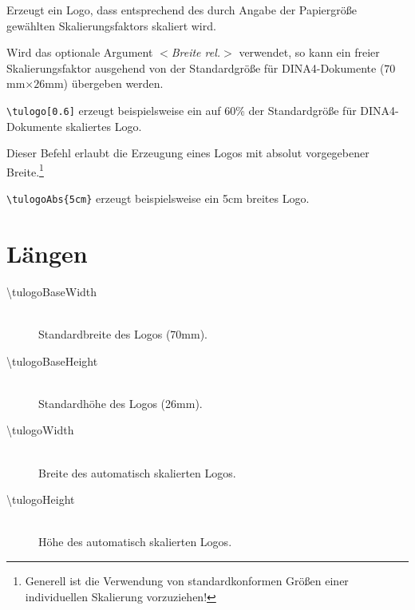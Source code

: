 \documentclass{scrartcl}
\begin{document}
\begin{description}\label{cmd:tulogo}
  \item[\color{tuRed}\mdseries\ttfamily \textbackslash tulogo%
    {[\textcolor{tuGreenDark}{\sffamily\itshape $<$Breite rel.$>$}]}]
    Erzeugt ein Logo, dass entsprechend des durch Angabe der Papiergröße
    gewählten Skalierungsfaktors skaliert wird.

    Wird das optionale Argument {\sffamily\itshape $<$Breite rel.$>$}
    verwendet, so kann ein freier Skalierungsfaktor ausgehend von der
    Standardgröße für DINA4-Dokumente ($70$mm$\times 26$mm) übergeben werden.

    \lstinline!\tulogo[0.6]! erzeugt beispielsweise ein auf 60\% der 
    Standardgröße für DINA4-Dokumente skaliertes Logo.

  \item[\color{tuRed}\ttfamily \textbackslash tulogoAbs%
    \{\textcolor{tuGreenDark}{Breite abs.}\}]
    Dieser Befehl erlaubt die Erzeugung eines Logos mit absolut vorgegebener
    Breite.\footnote{Generell ist die Verwendung von standardkonformen Größen
    einer individuellen Skalierung vorzuziehen!}

    \lstinline!\tulogoAbs{5cm}! erzeugt beispielsweise ein 5cm breites Logo.
\end{description}


\section{Längen}
  \begin{description}
    \item[\mdseries\ttfamily \textbackslash tulogoBaseWidth]\hfill\\
      Standardbreite des Logos (70mm).
    \item[\mdseries\ttfamily \textbackslash tulogoBaseHeight]\hfill\\
      Standardhöhe des Logos (26mm).
    \item[\mdseries\ttfamily \textbackslash tulogoWidth]\hfill\\
      Breite des automatisch skalierten Logos.
    \item[\mdseries\ttfamily \textbackslash tulogoHeight]\hfill\\
      Höhe des automatisch skalierten Logos.
  \end{description}
\end{document}
